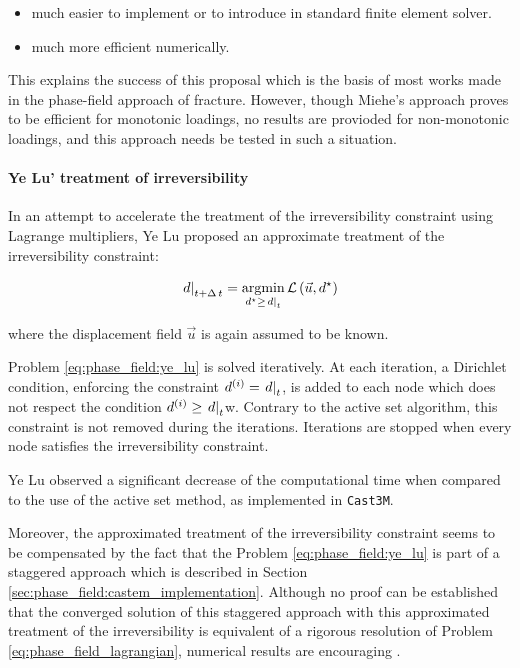 \begin{itemize}
    \item much easier to implement or to introduce in standard finite
    element solver.
    \item much more efficient numerically.
\end{itemize}

This explains the success of this proposal which is the basis of most
works made in the phase-field approach of fracture. However, though Miehe's approach proves to be efficient for monotonic loadings, no results are provioded for non-monotonic loadings, and this approach needs be tested in such a situation.

\paragraph{Ye Lu' treatment of irreversibility \cite{lu_schema_2019}
\label{sec:phase_field:ye_lu_irreversibility}}

In an attempt to accelerate the treatment of the irreversibility
constraint using Lagrange multipliers, Ye Lu proposed an approximate
treatment of the irreversibility constraint:

\begin{equation}
    \label{eq:phase_field:ye_lu}
    \left.d\right|_{t+\Delta\,t} = \underset{d^{\star}\geq\left.d\right|_{t}}{\mathrm{argmin}{}}\, \mathcal{L}\left(\vec{u},d^{\star}\right)
\end{equation}

where the displacement field \(\vec{u}\) is again assumed to be known.

Problem \eqref{eq:phase_field:ye_lu} is solved iteratively. At each iteration,
a Dirichlet condition, enforcing the constraint \(d^{(i)}=\left.d\right|_{t}\), is
added to each node which does not respect the condition
\(d^{(i)}\geq\left.d\right|_{t}\)w. Contrary to the active set algorithm, this
constraint is not removed during the iterations. Iterations are stopped
when every node satisfies the irreversibility constraint.

Ye Lu observed a significant decrease of the computational time when
compared to the use of the active set method, as implemented in
\texttt{Cast3M}.

Moreover, the approximated treatment of the irreversibility constraint
seems to be compensated by the fact that the Problem
\eqref{eq:phase_field:ye_lu} is part of a staggered approach which is described
in Section \ref{sec:phase_field:castem_implementation}. Although no proof can
be established that the converged solution of this staggered approach
with this approximated treatment of the irreversibility is equivalent of
a rigorous resolution of Problem \eqref{eq:phase_field_lagrangian}, numerical
results are encouraging \cite{lu_schema_2019}.

